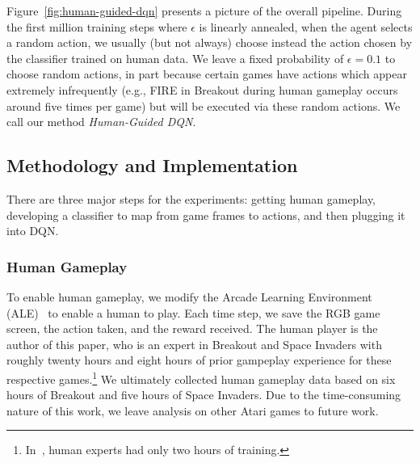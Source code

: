 \documentclass[letterpaper, 10pt, conference]{ieeeconf}
\begin{document}
Figure~\ref{fig:human-guided-dqn} presents a picture of the overall pipeline.
During the first million training steps where $\epsilon$ is linearly annealed,
when the agent selects a random action, we usually (but not always) choose
instead the action chosen by the classifier trained on human data. We leave a
fixed probability of $\epsilon=0.1$ to choose random actions, in part because
certain games have actions which appear extremely infrequently (e.g., FIRE in
Breakout during human gameplay occurs around five times per game) but will be
executed via these random actions. We call our method \emph{Human-Guided DQN}.

\subsection{Methodology and Implementation}\label{ssec:implementation}

There are three major steps for the experiments: getting human gameplay,
developing a classifier to map from game frames to actions, and then plugging it
into DQN. 

\subsubsection{Human Gameplay} To enable human gameplay, we modify the Arcade
Learning Environment (ALE)~\cite{bellemare13arcade} to enable a human to play.
Each time step, we save the RGB game screen, the action taken, and the reward
received. The human player is the author of this paper, who is an expert in
Breakout and Space Invaders with roughly twenty hours and eight hours of prior
gampeplay experience for these respective
games.\footnote{In~\cite{mnih-dqn-2015}, human experts had only two hours of
training.} We ultimately collected human gameplay data based on six hours of
Breakout and five hours of Space Invaders. Due to the time-consuming nature of
this work, we leave analysis on other Atari games to future work.
\end{document}
